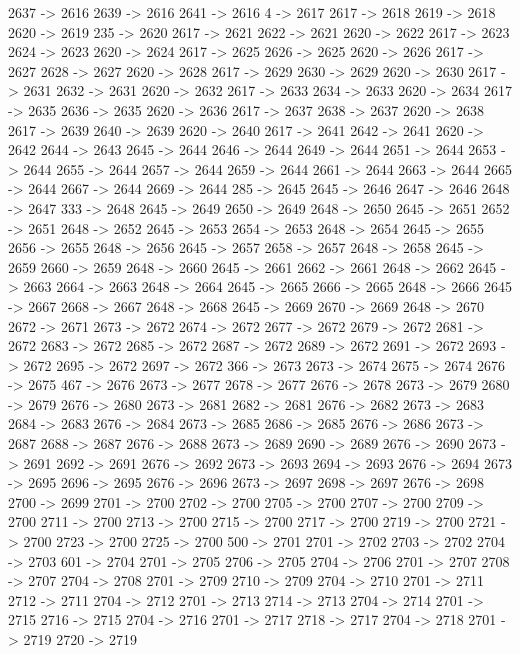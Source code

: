 {	2637 -> 2616
	2639 -> 2616
	2641 -> 2616
	4 -> 2617
	2617 -> 2618
	2619 -> 2618
	2620 -> 2619
	235 -> 2620
	2617 -> 2621
	2622 -> 2621
	2620 -> 2622
	2617 -> 2623
	2624 -> 2623
	2620 -> 2624
	2617 -> 2625
	2626 -> 2625
	2620 -> 2626
	2617 -> 2627
	2628 -> 2627
	2620 -> 2628
	2617 -> 2629
	2630 -> 2629
	2620 -> 2630
	2617 -> 2631
	2632 -> 2631
	2620 -> 2632
	2617 -> 2633
	2634 -> 2633
	2620 -> 2634
	2617 -> 2635
	2636 -> 2635
	2620 -> 2636
	2617 -> 2637
	2638 -> 2637
	2620 -> 2638
	2617 -> 2639
	2640 -> 2639
	2620 -> 2640
	2617 -> 2641
	2642 -> 2641
	2620 -> 2642
	2644 -> 2643
	2645 -> 2644
	2646 -> 2644
	2649 -> 2644
	2651 -> 2644
	2653 -> 2644
	2655 -> 2644
	2657 -> 2644
	2659 -> 2644
	2661 -> 2644
	2663 -> 2644
	2665 -> 2644
	2667 -> 2644
	2669 -> 2644
	285 -> 2645
	2645 -> 2646
	2647 -> 2646
	2648 -> 2647
	333 -> 2648
	2645 -> 2649
	2650 -> 2649
	2648 -> 2650
	2645 -> 2651
	2652 -> 2651
	2648 -> 2652
	2645 -> 2653
	2654 -> 2653
	2648 -> 2654
	2645 -> 2655
	2656 -> 2655
	2648 -> 2656
	2645 -> 2657
	2658 -> 2657
	2648 -> 2658
	2645 -> 2659
	2660 -> 2659
	2648 -> 2660
	2645 -> 2661
	2662 -> 2661
	2648 -> 2662
	2645 -> 2663
	2664 -> 2663
	2648 -> 2664
	2645 -> 2665
	2666 -> 2665
	2648 -> 2666
	2645 -> 2667
	2668 -> 2667
	2648 -> 2668
	2645 -> 2669
	2670 -> 2669
	2648 -> 2670
	2672 -> 2671
	2673 -> 2672
	2674 -> 2672
	2677 -> 2672
	2679 -> 2672
	2681 -> 2672
	2683 -> 2672
	2685 -> 2672
	2687 -> 2672
	2689 -> 2672
	2691 -> 2672
	2693 -> 2672
	2695 -> 2672
	2697 -> 2672
	366 -> 2673
	2673 -> 2674
	2675 -> 2674
	2676 -> 2675
	467 -> 2676
	2673 -> 2677
	2678 -> 2677
	2676 -> 2678
	2673 -> 2679
	2680 -> 2679
	2676 -> 2680
	2673 -> 2681
	2682 -> 2681
	2676 -> 2682
	2673 -> 2683
	2684 -> 2683
	2676 -> 2684
	2673 -> 2685
	2686 -> 2685
	2676 -> 2686
	2673 -> 2687
	2688 -> 2687
	2676 -> 2688
	2673 -> 2689
	2690 -> 2689
	2676 -> 2690
	2673 -> 2691
	2692 -> 2691
	2676 -> 2692
	2673 -> 2693
	2694 -> 2693
	2676 -> 2694
	2673 -> 2695
	2696 -> 2695
	2676 -> 2696
	2673 -> 2697
	2698 -> 2697
	2676 -> 2698
	2700 -> 2699
	2701 -> 2700
	2702 -> 2700
	2705 -> 2700
	2707 -> 2700
	2709 -> 2700
	2711 -> 2700
	2713 -> 2700
	2715 -> 2700
	2717 -> 2700
	2719 -> 2700
	2721 -> 2700
	2723 -> 2700
	2725 -> 2700
	500 -> 2701
	2701 -> 2702
	2703 -> 2702
	2704 -> 2703
	601 -> 2704
	2701 -> 2705
	2706 -> 2705
	2704 -> 2706
	2701 -> 2707
	2708 -> 2707
	2704 -> 2708
	2701 -> 2709
	2710 -> 2709
	2704 -> 2710
	2701 -> 2711
	2712 -> 2711
	2704 -> 2712
	2701 -> 2713
	2714 -> 2713
	2704 -> 2714
	2701 -> 2715
	2716 -> 2715
	2704 -> 2716
	2701 -> 2717
	2718 -> 2717
	2704 -> 2718
	2701 -> 2719
	2720 -> 2719
}
